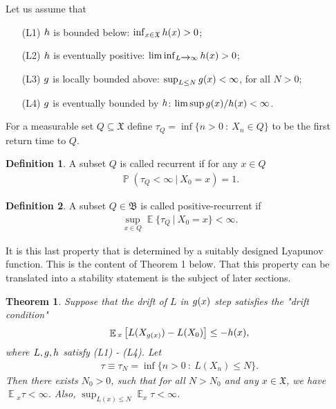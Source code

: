 \documentclass[10pt, reqno]{amsart}
\newtheorem*{theorem*}{Theorem}
\theoremstyle{definition}
\newtheorem{definition}{Definition}[section]
\newcommand{\aasVar}{Q} %
\newcommand{\asaVar}{\mathfrak{B}} %
\newcommand{\astVar}{\tau} %
\newcommand{\ltfVar}{L} %
\newcommand{\assVar}{\mathfrak{X}} %
\DeclareMathOperator*{\E}{\mathbb{E}}
\DeclareMathOperator*{\Pb}{\mathbb{P}}
\begin{document}
	Let us assume that
	\begin{enumerate}
		\item[(L1)] $h$ is bounded below: $\inf_{x \in \assVar}\hffVar(x) > 0$;
		\item[(L2)] $h$ is eventually positive: $\liminf_{\ltfVar \xrightarrow{} \infty}\hffVar(x) > 0$;
		\item[(L3)] $g$ is locally bounded above: $\sup_{\ltfVar \leq N}\gffVar(x) < \infty$, for all $N > 0$;
		\item[(L4)] $g$ is eventually bounded by $h$: $\limsup g(x)/h(x) < \infty$.
	\end{enumerate}
	For a measurable set $\aasVar \subseteq \assVar$ define $\astVar_{\aasVar} = \inf\{n > 0 \: : \: X_{n} \in \aasVar\}$ to be the first return time to $\aasVar$. 
	\begin{definition}
		A subset $\aasVar$ is called recurrent if for any $x \in \aasVar$
		\begin{gather*}
			\Pb(\astVar_{\aasVar} < \infty \: | \: X_{0} = x) = 1.
		\end{gather*}
	\end{definition}
	\begin{definition}
		A subset $\aasVar \in \asaVar$ is called positive-recurrent if
		\begin{gather}
			\sup_{x \in \aasVar}\E\{\astVar_{\aasVar} \: | \: X_{0} = x\} < \infty.
		\end{gather}
	\end{definition}
	It is this last property that is determined by a suitably designed Lyapunov function. This is the content of Theorem 1 below. That this property can be translated into a stability statement is the subject of later sections.
	\begin{theorem*}
		Suppose that the drift of $\ltfVar$ in $g(x)$ step satisfies the "drift condition"
		\begin{gather*}
			\E{}_{x}\left[\ltfVar(X_{\gffVar(x)}) - \ltfVar(X_{0})\right] \leq -\hffVar(x),
		\end{gather*}
		where $\ltfVar, \gffVar, \hffVar$ satisfy (L1) - (L4). Let
		\begin{gather*}
			\astVar \equiv \astVar_{N} = \inf\{n > 0 \: :  \: \ltfVar(X_{n}) \leq N\}.
		\end{gather*}
		Then there exists $N_{0} > 0$, such that for all $N > N_{0}$ and any $x \in \assVar$, we have $\E{}_{x}\astVar < \infty$. Also, $\sup_{\ltfVar(x) \leq N}\E_{x}\astVar < \infty$.
	\end{theorem*}
\end{document}

